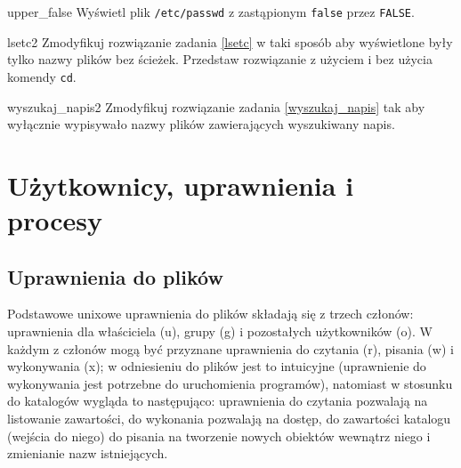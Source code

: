 \documentclass{pdfBooklets}
\begin{document}
\setcounter{subsection}{0} %

\begin{Zadanie}{}{upper_false}
Wyświetl plik \texttt{/etc/passwd} z zastąpionym \texttt{false} przez \texttt{FALSE}.
\end{Zadanie}

\begin{Zadanie}{}{lsetc2}
Zmodyfikuj rozwiązanie zadania \ref{lsetc} w taki sposób aby wyświetlone były tylko nazwy plików bez ścieżek. Przedstaw rozwiązanie z użyciem i bez użycia komendy \texttt{cd}.
\end{Zadanie}


\begin{Zadanie}{}{wyszukaj_napis2} %
Zmodyfikuj rozwiązanie zadania \ref{wyszukaj_napis} tak aby wyłącznie wypisywało nazwy plików zawierających wyszukiwany napis.
\end{Zadanie}


\section{Użytkownicy, uprawnienia i procesy}


\subsection{Uprawnienia do plików}
Podstawowe unixowe uprawnienia do plików składają się z trzech członów: uprawnienia dla właściciela (u), grupy (g) i pozostałych użytkowników (o).
W każdym z członów mogą być przyznane uprawnienia do czytania (r), pisania (w) i wykonywania (x); w odniesieniu do plików jest to intuicyjne (uprawnienie do wykonywania jest potrzebne do uruchomienia programów), natomiast w stosunku do katalogów wygląda to następująco: uprawnienia do czytania pozwalają na listowanie zawartości, do wykonania pozwalają na dostęp, do zawartości katalogu (wejścia do niego) do pisania na tworzenie nowych obiektów wewnątrz niego i zmienianie nazw istniejących.
\end{document}

